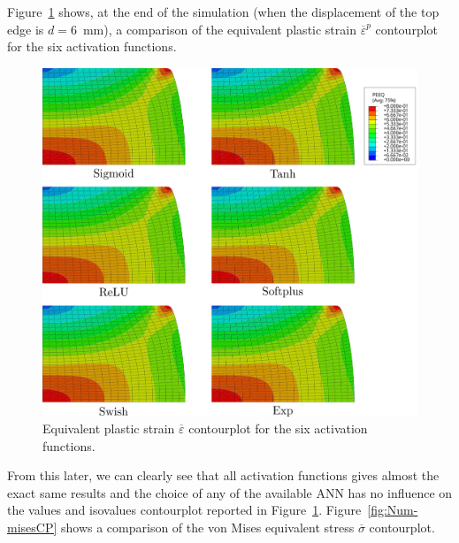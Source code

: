\documentclass[algorithms,article,submit,pdftex,oneauthors]{Definitions/mdpi}
\begin{document}
\textcolor{greencolor}{Figure~\ref{fig:Num-peeqCP} shows, at the end of the simulation (when the displacement of the top edge is $d=6$~mm), a comparison of the equivalent plastic strain $\overline{\varepsilon}^p$ contourplot for the six activation functions.}
\begin{figure}[h!]
\centering
\includegraphics[width=0.9\columnwidth]{Figures/PeeqHalf}
\caption{Equivalent plastic strain $\overline{\varepsilon}$ contourplot for the six activation functions.}
\label{fig:Num-peeqCP}
\end{figure}
From this later, we can clearly see that all activation functions gives almost the exact same results and the choice of any of the available ANN has no influence on the values and isovalues contourplot reported in Figure~\ref{fig:Num-peeqCP}.
Figure~\ref{fig:Num-misesCP} shows a comparison of the von Mises equivalent stress $\overline{\sigma}$ contourplot.
\end{document}
